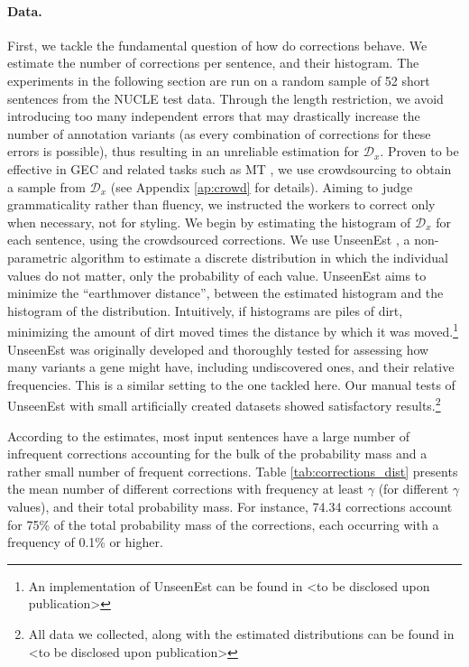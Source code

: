 \documentclass[a4paper, 11pt]{article}
\newcommand{\com}[1]{}
\begin{document}
\paragraph{Data.}
First, we tackle the fundamental question of how do corrections behave. We estimate the number of corrections per sentence, and their histogram.
The experiments in the following section are run on a random sample of 52 short sentences from the NUCLE test data. Through the length restriction, we avoid introducing too many independent errors that may drastically increase the number of annotation variants (as every combination of corrections for these errors is possible), thus resulting in an unreliable estimation for $\mathcal{D}_x$. Proven to be effective in GEC \cite{madnani2011they} and related tasks such as MT \cite{zaidan2011crowdsourcing, post2012constructing}, 
we use crowdsourcing to obtain a sample from $\mathcal{D}_x$ (see Appendix  \ref{ap:crowd} for details).
Aiming to judge grammaticality rather than fluency, we instructed the workers to correct only when necessary, not for styling.
We begin by estimating the histogram of $\mathcal{D}_x$ for each sentence, using the crowdsourced corrections.
We use {\sc UnseenEst} \cite{zou2015quantifying}, a non-parametric algorithm to
estimate a discrete distribution in which the individual values do not matter, only the probability of each value. 
{\sc UnseenEst} aims to minimize the ``earthmover distance'', between the estimated histogram and the histogram of the distribution. 
Intuitively, if histograms are piles of dirt, minimizing the amount of dirt moved times the distance by 
which it was moved.\footnote{An implementation of {\sc UnseenEst} can be found in <to be disclosed upon publication>\com{\href{https://github.com/borgr/unseenest}}} 
{\sc UnseenEst} was originally developed and thoroughly tested for assessing how many
variants a gene might have, including undiscovered ones, and their relative frequencies.
This is a similar setting to the one tackled here.
Our manual tests of {\sc UnseenEst} with small artificially created datasets
showed satisfactory results.\footnote{All data we collected, along with the estimated
  distributions can be found in <to be disclosed upon publication>}

According to the estimates, most input sentences have a large number of
infrequent corrections accounting for the bulk of the probability mass
and a rather small number of frequent corrections.
Table \ref{tab:corrections_dist} presents the mean number of different corrections with frequency at least $\gamma$ (for different $\gamma$ values), and their total probability mass.
For instance, 74.34 corrections account for 75\% of the total probability mass of the corrections, each occurring with a frequency of 0.1\% or higher.
\end{document}
